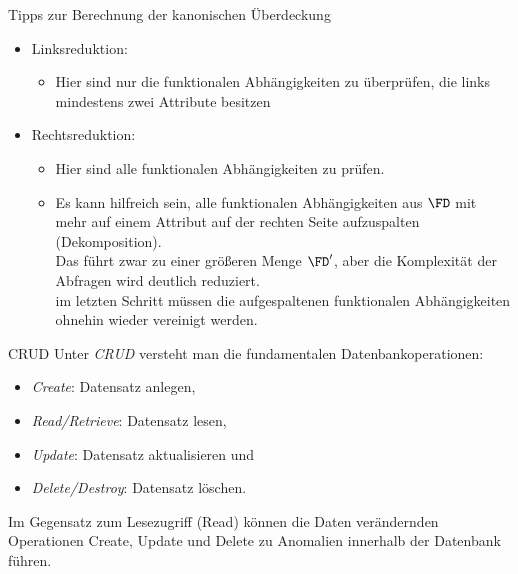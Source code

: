 \begin{bonus}{Tipps zur Berechnung der kanonischen Überdeckung}
    \begin{itemize}
        \item Linksreduktion:
              \begin{itemize}
                  \item Hier sind nur die funktionalen Abhängigkeiten zu überprüfen, die links mindestens zwei Attribute besitzen
              \end{itemize}
        \item Rechtsreduktion:
              \begin{itemize}
                  \item Hier sind alle funktionalen Abhängigkeiten zu prüfen.
                  \item Es kann hilfreich sein, alle funktionalen Abhängigkeiten aus $\FD$ mit mehr auf einem Attribut auf der rechten Seite aufzuspalten (Dekomposition).\\
                        Das führt zwar zu einer größeren Menge $\FD'$, aber die Komplexität der Abfragen wird deutlich reduziert.\\
                        im letzten Schritt müssen die aufgespaltenen funktionalen Abhängigkeiten ohnehin wieder vereinigt werden.
              \end{itemize}
    \end{itemize}
\end{bonus}

\begin{bonus}{CRUD}
    Unter \emph{CRUD} versteht man die fundamentalen Datenbankoperationen:
    \begin{itemize}
        \item \emph{Create}: Datensatz anlegen,
        \item \emph{Read/Retrieve}: Datensatz lesen,
        \item \emph{Update}: Datensatz aktualisieren und
        \item \emph{Delete/Destroy}: Datensatz löschen.
    \end{itemize}

    Im Gegensatz zum Lesezugriff (Read) können die Daten verändernden Operationen Create, Update und Delete zu Anomalien innerhalb der Datenbank führen.
\end{bonus}

